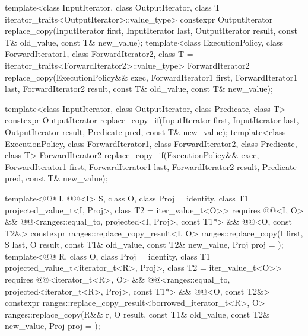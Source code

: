 %
%
\begin{itemdecl}
template<class InputIterator, class OutputIterator,
         class T = iterator_traits<OutputIterator>::value_type>
  constexpr OutputIterator
    replace_copy(InputIterator first, InputIterator last,
                 OutputIterator result,
                 const T& old_value, const T& new_value);
template<class ExecutionPolicy, class ForwardIterator1, class ForwardIterator2,
         class T = iterator_traits<ForwardIterator2>::value_type>
  ForwardIterator2
    replace_copy(ExecutionPolicy&& exec,
                 ForwardIterator1 first, ForwardIterator1 last,
                 ForwardIterator2 result,
                 const T& old_value, const T& new_value);

template<class InputIterator, class OutputIterator, class Predicate, class T>
  constexpr OutputIterator
    replace_copy_if(InputIterator first, InputIterator last,
                    OutputIterator result,
                    Predicate pred, const T& new_value);
template<class ExecutionPolicy, class ForwardIterator1, class ForwardIterator2,
         class Predicate, class T>
  ForwardIterator2
    replace_copy_if(ExecutionPolicy&& exec,
                    ForwardIterator1 first, ForwardIterator1 last,
                    ForwardIterator2 result,
                    Predicate pred, const T& new_value);

template<@@ I, @@<I> S, class O,
         class Proj = identity, class T1 = projected_value_t<I, Proj>, class T2 = iter_value_t<O>>
  requires @@<I, O> &&
           @@<ranges::equal_to, projected<I, Proj>, const T1*> &&
           @@<O, const T2&>
  constexpr ranges::replace_copy_result<I, O>
    ranges::replace_copy(I first, S last, O result, const T1& old_value, const T2& new_value,
                         Proj proj = {});
template<@@ R, class O, class Proj = identity,
         class T1 = projected_value_t<iterator_t<R>, Proj>, class T2 = iter_value_t<O>>
  requires @@<iterator_t<R>, O> &&
           @@<ranges::equal_to, projected<iterator_t<R>, Proj>, const T1*>
           && @@<O, const T2&>
  constexpr ranges::replace_copy_result<borrowed_iterator_t<R>, O>
    ranges::replace_copy(R&& r, O result, const T1& old_value, const T2& new_value,
                         Proj proj = {});


\end{itemdecl}
